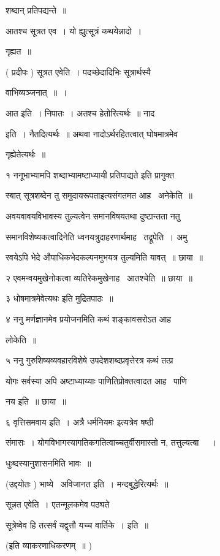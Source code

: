\documentclass[11pt, openany]{book}
\begin{document}
शब्दान् प्रतिपद्यन्ते~॥ 

आतश्च सूत्रत एव~। यो ह्युत्सूत्रं कथयेन्नादो~। 

गृह्यत~॥ 

( प्रदीपः ) सूत्रत एवेति~। पदच्छेदादिभिः सूत्रार्थस्यै \textendash\ 

वाभिव्यञ्जनात्~॥~। 

आत इति~। निपातः~। अतश्च हेतोरित्यर्थः~॥ नाद 

इति~। नैतदित्यर्थः~॥ अथवा नादोऽर्थरहितत्वात् घोषमात्रमेव 

गृह्येतेत्यर्थः~॥ 



१ ननूभाभ्यामपि शब्दाभ्यामष्टाध्यायी प्रतिपाद्यते इति प्रागुक्त \textendash\ 

स्बात् {\qt सूत्रशब्देन तु समुदायरूपता}इत्यसंगतमत आह \textendash\ अनेकेति~॥ 

अवयवावयविभावस्य तुल्यत्वेन समानविषयतथा दुष्टान्तता नतु 

समानविशेष्यकत्वादिनेति ध्वनयत्रुदाहरणार्थमाह \textendash\ तद्रूपेति~। अमु \textendash\ 

रवयेऽपि भेदे औपाधिकभेदकल्पनमुभयत्र तुल्यमिति यावत्~॥ छाया~॥ 

२ एवमन्वयमुखेनोकत्वा व्यतिरेकमुखेनाह \textendash\ आतश्चेति~॥ छाया~॥ 

३ {\qt धोषमात्रमेवेत्यथः} इति मुद्रितपाठः~॥ 

४ ननु मर्णज्ञानमेव प्रयोजनमिति कथं शङ्कावसरोऽत आह \textendash\ 

लोकेति~॥ 

५ ननु गुरुशिष्यव्यवहारविशेषे उपदेशशब्दप्रवृत्तेरत्र कथं तत्प्र \textendash\ 

योगः सर्वस्या अपि अष्टाध्याय्याः पाणितिप्रोक्तत्वादत आह \textendash\ पाणि \textendash\ 

नय इति~॥ छाया~॥ 

६ {\qt वृत्तिसमवाय इति~। अत्रै धर्मनियमः} इत्यत्रेव षष्ठी \textendash\ 

संमासः~। योगविभागस्यागतिकगतित्वाच्चतुर्वीसमास्तो न, तत्तुल्यत्बा \textendash\ ~। 





धुःब्दस्यानुशासनमिति भावः~॥ 

(उद्दयोतः ) भाष्ये \textendash\ अविजानत इति~। मन्दबुद्धेरित्यर्थः~॥ 

सून्नत एवेति~। एतन्मूलकमेव पठ्यते \textendash\ 

{\qt सूत्रेष्वेव हि तत्सर्वं यद्वृत्तौ यच्च वार्तिके~। इति~॥}

(इति व्याकरणाधिकरणम्~॥ ) 
\end{document}
